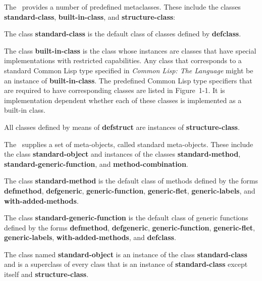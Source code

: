 \endsubSection%


The \CLOS\ provides a number of predefined metaclasses.  These include the
classes {\bf standard-class}, {\bf built-in-class}, and {\bf
structure-class}:

\beginlist

\item{\bull}
The class {\bf standard-class} is the default class of classes defined
by {\bf defclass}.

\item{\bull} The class {\bf built-in-class} is the class whose
instances are classes that have special implementations with
restricted capabilities.  Any class that corresponds to a standard
Common Lisp type specified in {\it Common Lisp: The Language\/}
might be an instance of {\bf built-in-class}.
The predefined Common Lisp type specifiers that are required to have
corresponding classes are listed in Figure~1-1.  It is implementation
dependent whether each of these classes is implemented as a built-in class.

\item{\bull}
All classes defined by means of {\bf defstruct} are instances of 
{\bf structure-class}.
\endlist

\endsubSection%


The \OS\ supplies a set of meta-objects, called {\bit standard
meta-objects}. These include the class {\bf standard-object} and
instances of the classes {\bf standard-method}, {\bf
standard-generic-function}, and {\bf method-combination}.

\beginlist

\item{\bull} 
The class {\bf standard-method} is the default class of
methods defined by the forms {\bf defmethod}, {\bf
defgeneric}, {\bf generic-function}, {\bf generic-flet}, {\bf
generic-labels}, and {\bf with-added-methods}.

\item{\bull}
The class {\bf standard-generic-function} is the default class of 
generic functions defined by the forms {\bf defmethod},
{\bf defgeneric}, {\bf generic-function}, {\bf generic-flet},
{\bf generic-labels}, {\bf with-added-methods}, and {\bf defclass}.

\item{\bull} The class named {\bf standard-object} is an instance of
the class {\bf standard-class} and is a superclass of every class that
is an instance of {\bf standard-class} except itself and {\bf
structure-class}.

